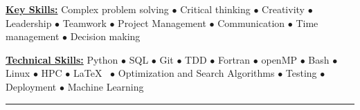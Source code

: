 \vspace*{-5mm}
\begin{multicols}{2}
    \begin{spacing}{1}
        \href{.}{\bf Key Skills:}
        Complex problem solving $\bullet$ Critical thinking $\bullet$ Creativity $\bullet$ Leadership $\bullet$ Teamwork $\bullet$ Project Management $\bullet$ Communication $\bullet$ Time management $\bullet$ Decision making

        \href{.}{\bf Technical Skills:}
        Python $\bullet$ SQL $\bullet$ Git $\bullet$ TDD $\bullet$ Fortran $\bullet$ openMP $\bullet$ Bash $\bullet$ Linux $\bullet$ HPC $\bullet$ \LaTeX~ $\bullet$ Optimization and Search Algorithms $\bullet$ Testing $\bullet$ Deployment $\bullet$ Machine Learning
    \end{spacing}
\end{multicols}

\vspace*{-8mm}
\begin{center}
    \par\rule{1.0\textwidth}{0.6pt}
\end{center}